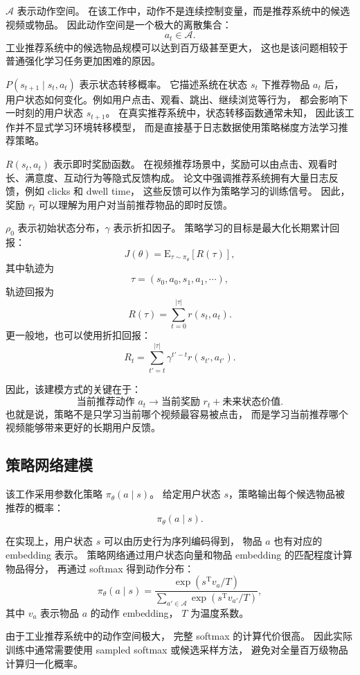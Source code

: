 \documentclass[11pt]{ctexart}
\begin{document}
$\mathcal{A}$ 表示动作空间。
在该工作中，动作不是连续控制变量，而是推荐系统中的候选视频或物品。
因此动作空间是一个极大的离散集合：
\[
a_t \in \mathcal{A}.
\]
工业推荐系统中的候选物品规模可以达到百万级甚至更大，
这也是该问题相较于普通强化学习任务更加困难的原因。

$P(s_{t+1}\mid s_t,a_t)$ 表示状态转移概率。
它描述系统在状态 $s_t$ 下推荐物品 $a_t$ 后，
用户状态如何变化。例如用户点击、观看、跳出、继续浏览等行为，
都会影响下一时刻的用户状态 $s_{t+1}$。
在真实推荐系统中，状态转移函数通常未知，
因此该工作并不显式学习环境转移模型，
而是直接基于日志数据使用策略梯度方法学习推荐策略。

$R(s_t,a_t)$ 表示即时奖励函数。
在视频推荐场景中，奖励可以由点击、观看时长、满意度、互动行为等隐式反馈构成。
论文中强调推荐系统拥有大量日志反馈，例如 clicks 和 dwell time，
这些反馈可以作为策略学习的训练信号。
因此，奖励 $r_t$ 可以理解为用户对当前推荐物品的即时反馈。

$\rho_0$ 表示初始状态分布，$\gamma$ 表示折扣因子。
策略学习的目标是最大化长期累计回报：
\[
J(\theta)
=
\mathrm{E}_{\tau\sim \pi_{\theta}}
\left[
R(\tau)
\right],
\]
其中轨迹为
\[
\tau=(s_0,a_0,s_1,a_1,\cdots),
\]
轨迹回报为
\[
R(\tau)
=
\sum_{t=0}^{|\tau|} r(s_t,a_t).
\]
更一般地，也可以使用折扣回报：
\[
R_t
=
\sum_{t'=t}^{|\tau|}
\gamma^{t'-t}r(s_{t'},a_{t'}).
\]

因此，该建模方式的关键在于：
\[
\text{当前推荐动作 }a_t
\rightarrow
\text{当前奖励 }r_t
+
\text{未来状态价值}.
\]
也就是说，策略不是只学习当前哪个视频最容易被点击，
而是学习当前推荐哪个视频能够带来更好的长期用户反馈。

\subsection{策略网络建模}

该工作采用参数化策略 $\pi_{\theta}(a\mid s)$。
给定用户状态 $s$，策略输出每个候选物品被推荐的概率：
\[
\pi_{\theta}(a\mid s).
\]

在实现上，用户状态 $s$ 可以由历史行为序列编码得到，
物品 $a$ 也有对应的 embedding 表示。
策略网络通过用户状态向量和物品 embedding 的匹配程度计算物品得分，
再通过 softmax 得到动作分布：
\[
\pi_{\theta}(a\mid s)
=
\frac{
\exp(s^{\mathrm{T}}v_a / T)
}{
\sum_{a'\in\mathcal{A}}
\exp(s^{\mathrm{T}}v_{a'} / T)
},
\]
其中 $v_a$ 表示物品 $a$ 的动作 embedding，
$T$ 为温度系数。

由于工业推荐系统中的动作空间极大，
完整 softmax 的计算代价很高。
因此实际训练中通常需要使用 sampled softmax 或候选采样方法，
避免对全量百万级物品计算归一化概率。
\end{document}
